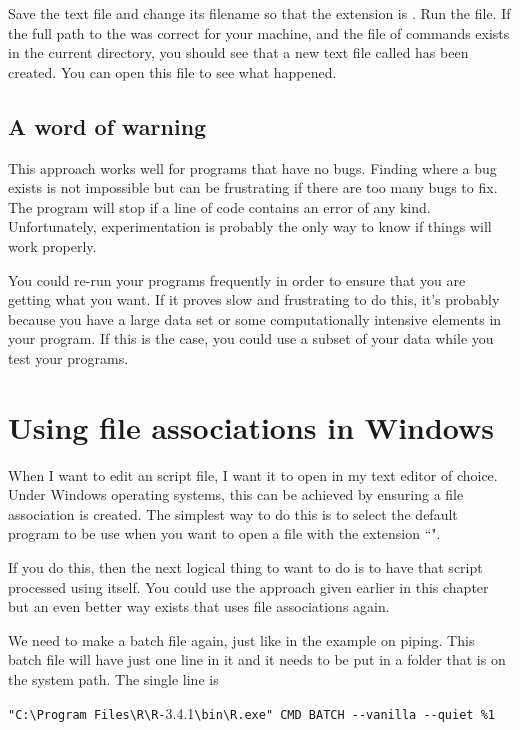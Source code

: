 Save the text file and change its filename so that the extension is . Run the file. If the full path to the  was correct for your machine, and the file of commands  exists in the current directory, you should see that a new text file called  has been created. You can open this file to see what happened. 
 
\subsection*{A word of warning} 
 
This approach works well for programs that have no bugs. Finding where a bug exists is not impossible but can be frustrating if there are too many bugs to fix. The program will stop if a line of code contains an error of any kind. Unfortunately, experimentation is probably the only way to know if things will work properly.  
 
You could re-run your programs frequently in order to ensure that you are getting what you want. If it proves slow and frustrating to do this, it's probably because you have a large data set or some computationally intensive elements in your program. If this is the case, you could use a subset of your data while you test your programs. 
 
 
 
\section{Using file associations in Windows} 
 
When I want to edit an \R{} script file, I want it to open in my text editor of choice. Under Windows operating systems, this can be achieved by ensuring a file association is created. The simplest way to do this is to select the default program to be use when you want to open a file with the extension ``". 
 
If you do this, then the next logical thing to want to do is to have that \R{} script processed using \R{} itself. You could use the approach given earlier in this chapter but an even better way exists that uses file associations again. 
 
We need to make a batch file again, just like in the example on piping. This batch file will have just one line in it and it needs to be put in a folder that is on the system path. The single line is 
\begin{center} 
\verb+"C:\Program Files\R\R-+3.4.1\verb+\bin\R.exe" CMD BATCH --vanilla --quiet %1+ 
\end{center} 
 
